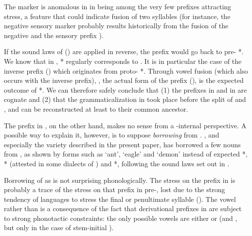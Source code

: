 \documentclass[output=paper]{langsci/langscibook}
\begin{document}
The  marker  is anomalous in  in being among the very few prefixes attracting stress, a feature that could indicate fusion of two syllables (for instance, the negative sensory marker  probably results historically from the fusion of the negative  and the sensory prefix ).

If the sound laws of  (\citealt{jacques04these}) are applied in reverse, the prefix  would go back to pre- *. We know that in , * regularly corresponds to . It is in particular the case of the inverse prefix  (\citealt{jackson02rentongdengdi}) which originates from proto- *. Through vowel fusion (which also occurs with the inverse prefix), , the actual form of the  prefix (\citealt[107]{jackson98morphology}), is the expected outcome of *. We can therefore safely conclude that (1) the  prefixes  in  and  in  are cognate and (2) that the grammaticalization in  took place before the split of  and , and can be reconstructed at least to their common ancestor.

The  prefix  in , on the other hand, makes no sense from a -internal perspective. A possible way to explain it, however, is to suppose \textit{borrowing} from  . , and especially the  variety described in the present paper, has borrowed a few nouns from , as shown by forms such as  `ant',  `eagle' and  `demon' instead of expected *, * (attested in some dialects of ) and *, following the sound laws set out in \citet{jacques04these}.

Borrowing of   as   is not surprising phonologically. The stress on the prefix in  is probably a trace of the stress on that prefix in pre-, lost due to the strong tendency of  languages to stress the final or penultimate syllable (\citealt{jackson05yingao}). The vowel  rather than  is a consequence of the fact that derivational prefixes in  are subject to strong phonotactic constraints: the only possible vowels are either  or  (and , but only in the case of stem-initial ).
\end{document}
